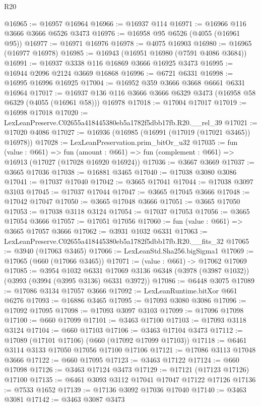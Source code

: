 \begin{lexlean}{R20}
\begin{coremodule}
@16965 := @16957 @16964
@16966 := @16937 @114
@16971 := @16966 @116 @3666 @3666 @6526 @3473
@16976 := @16958 @95 @6526 (@4055 (@16961 @95))
@16977 := @16971 @16976
@16978 := @4075 @16903
@16980 := @16965 (@16977 @16978)
@16985 := @16943 (@16951 @16980 (@7591 @4086 @3684))
@16991 := @16937 @3338 @116 @16869 @3666 @16925 @3473
@16995 := @16944 @2096 @2124 @3669 @16868
@16996 := @6721 @6331
@16998 := @16995 @16996 @16925
@17004 := @16952 @359 @3666 @3668 @6661 @6331 @16964
@17017 := @16937 @136 @116 @3666 @3666 @6329 @3473 (@16958 @58 @6329 (@4055 (@16961 @58))) @16978
@17018 := @17004 @17017
@17019 := @16998 @17018
@17020 := LexLeanPreserve.C02655a418445380eb5a1782f5dbb17fb.R20.__rel_39
@17021 := @17020 @4086
@17027 := @16936 (@16985 (@16991 (@17019 (@17021 @3465)) @16978))
@17028 := LexLeanPreservation.prim_bitOr_u32
@17035 := fun (value : @661) =>
  fun (amount : @661) => fun (complement : @661) => @16913 (@17027 (@17028 @16920 @16924))
@17036 := @3667 @3669
@17037 := @3665 @17036
@17038 := @16881 @3465
@17040 := @17038 @3080 @3086
@17041 := @17037 @17040
@17042 := @3665 @17041
@17044 := @17038 @3097 @3103
@17045 := @17037 @17044
@17047 := @3665 @17045 @3666
@17048 := @17042 @17047
@17050 := @3665 @17048 @3666
@17051 := @3665 @17050
@17053 := @17038 @3118 @3124
@17054 := @17037 @17053
@17056 := @3665 @17054 @3666
@17057 := @17051 @17056
@17060 := fun (value : @661) => @3665 @17057 @3666
@17062 := @3931 @1032 @6331
@17063 := LexLeanPreserve.C02655a418445380eb5a1782f5dbb17fb.R20.__fits_32
@17065 := @3940 (@17063 @3465)
@17066 := LexLeanStd.Sha256.bigSigma1
@17069 := @17065 (@660 (@17066 @3465))
@17071 := (value : @661) -> @17062 @17069
@17085 := @3954
    @1032
    @6331
    @17069
    @3136
    @6348
    (@3978 (@3987 @1032))
    (@3993 (@3994 (@3995 @3136) @6331 @3972))
@17086 := @6448 @3075
@17089 := @17086 @3134 @17057 @3666
@17092 := LexLeanRuntime.bitXor @661 @6276
@17093 := @16886 @3465
@17095 := @17093 @3080 @3086
@17096 := @17092 @17095
@17098 := @17093 @3097 @3103
@17099 := @17096 @17098
@17100 := @660 @17099
@17101 := @3463 @17100
@17103 := @17093 @3118 @3124
@17104 := @660 @17103
@17106 := @3463 @17104 @3473
@17112 := @17089 (@17101 @17106) (@660 (@17092 @17099 @17103))
@17118 := @6461 @3114 @3133 @17050 @17056 @17100 @17106
@17121 := @17086 @3113 @17048 @3666
@17122 := @660 @17095
@17123 := @3463 @17122
@17124 := @660 @17098
@17126 := @3463 @17124 @3473
@17129 := @17121 (@17123 @17126) @17100
@17135 := @6461 @3093 @3112 @17041 @17047 @17122 @17126
@17136 := @7533 @1652
@17139 := @17136 @3092 @17036 @17040
@17140 := @3463 @3081
@17142 := @3463 @3087 @3473

\end{coremodule}
\end{lexlean}
